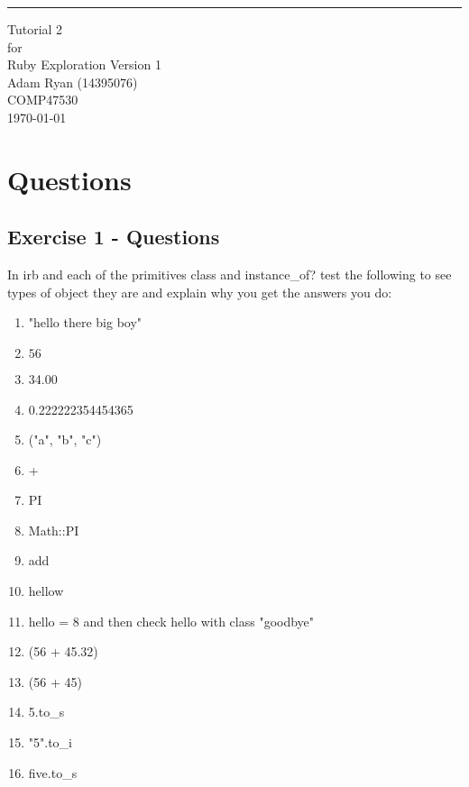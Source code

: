 \documentclass{scrreprt}
\date{}
\def\myversion{1 }
\begin{document}
	
	\begin{flushright}
		\rule{16cm}{5pt}\vskip1cm
		\begin{bfseries}
			\Huge{Tutorial 2\\}
			\vspace{1.9cm}
			for\\
			\vspace{1.9cm}
			Ruby Exploration
			\vspace{1.9cm}
			\LARGE{Version \myversion}\\
			\vspace{1.9cm}
			Adam Ryan (14395076)\\
			\vspace{1.9cm}
			COMP47530\\
			\vspace{1.9cm}
			\today\\
		\end{bfseries}
	\end{flushright}
	
	\tableofcontents
	
	\chapter{Questions}\label{Intro}
	
	
	\section{Exercise 1 - Questions}\label{E1Q}
	In irb and each of the primitives class and instance\_of? test the following to see types of object they are and explain why you get the answers you do:
	\begin{enumerate}
		\item "hello there big boy"
		\item $56$
		\item 34.00 
		\item 0.222222354454365 
		\item ("a", "b", "c")
		\item +
		\item PI 
		\item Math::PI 
		\item add 
		\item hellow
		\item hello = 8 and then check hello with class "goodbye"
		\item (56 + 45.32)
		\item (56 + 45)
		\item 5.to\_s 
		\item "5".to\_i 
		\item five.to\_s
	\end{enumerate}
	
\end{document}
